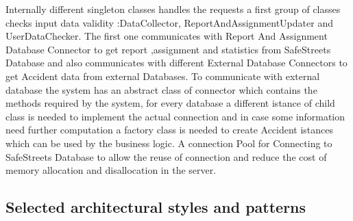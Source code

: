 Internally different singleton classes handles the requests a first group of classes checks input data validity :DataCollector, ReportAndAssignmentUpdater and UserDataChecker. The first one communicates with Report And Assignment Database Connector to get report ,assignment and statistics from SafeStreets Database and also communicates with different External Database Connectors to get Accident data from external Databases. To communicate with external database the system has an abstract class of connector which contains the methods required by the system, for every database a different istance of child class  is needed to implement the actual connection and in case some information need further computation a factory class is needed to create Accident istances which can be used by the business logic. A connection Pool for Connecting to SafeStreets Database to allow the reuse of connection and reduce the cost of memory allocation and disallocation in the server.
\subsection{Selected architectural styles and patterns}
